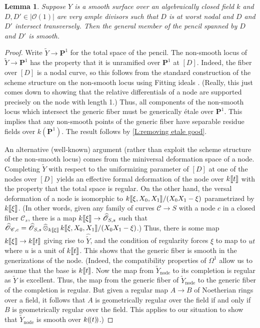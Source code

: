 \documentclass[11pt]{amsart}
\newcommand{\field}[1]{\mathbf #1}
\newcommand{\ms}[1]{\mathscr #1}
\renewcommand{\P}{\field P}
\renewcommand{\[}{[\!\hspace{0.03em}[}
\renewcommand{\]}{]\!\hspace{0.03em}]}
\renewcommand{\(}{(\!\hspace{0.03em}(}
\renewcommand{\)}{)\!\hspace{0.03em})}
\DeclareMathOperator*{\tensor}{\otimes}
\DeclareMathOperator*{\ctensor}{\widehat{\tensor}}
\newtheorem{lem}{Lemma}[subsubsection]%
\theoremstyle{definition}
\theoremstyle{remark}
\begin{document}
\begin{lem}\label{L:nodal pencil good} Suppose $Y$ is a smooth surface over an algebraically 
closed field $k$ and $D,D'\in|{\ms O}(1)|$ are 
very ample divisors such that $D$ is at worst nodal and $D$ and $D'$ intersect 
transversely.  Then the general member of the pencil spanned by $D$ 
and $D'$ is smooth.
\end{lem}
\begin{proof} Write $\widetilde Y\to\P^{1}$ for the total space of 
the pencil.   The non-smooth locus of $\widetilde Y\to\P^{1}$ has 
the property that it is unramified over $\P^{1}$ at $[D]$.  Indeed, 
the fiber over $[D]$ is a nodal curve, so this follows from the 
standard construction of the scheme structure on the non-smooth locus 
using Fitting ideals \cite[2.21]{dejong-alterations}.  (Really, this just comes down to showing 
that the relative differentials of a node are supported precisely on 
the node with length 1.)  
Thus, 
all components of the non-smooth locus which intersect the generic fiber must be generically \'etale over $\P^{1}$.  This 
implies that any non-smooth points of the generic fiber have separable 
residue fields over $k(\P^{1})$.  The result follows by 
\ref{L:removing etale good}.

An alternative (well-known) argument (rather than exploit the scheme structure of 
the non-smooth locus) comes from the miniversal deformation space of a 
node.  Completing $\widetilde Y$ with respect to the uniformizing 
parameter of $[D]$ at one of the nodes over $[D]$ 
yields an effective formal deformation of the node over $k\[t\]$ with 
the property that the total space is regular.  On the other hand, the 
versal deformation of a node is isomorphic to 
$k\[\xi,X_{0},X_{1}\]/(X_{0}X_{1}-\xi)$ parametrized by $k\[\xi\]$.  
(In other words, given any family of curves $\ms C\to S$ with a node 
$c$ in a closed fiber $\ms C_{s}$, there is a map 
$k\[\xi\]\to\widehat{{\ms O}}_{S,s}$ such that $\widehat{{\ms O}}_{\ms 
C,c}=\widehat{{\ms O}}_{S,s}\ctensor_{k\[\xi\]}k\[\xi,X_{0},X_{1}\]/(X_{0}X_{1}-\xi)$.)
Thus, there is some map $k\[\xi\]\to k\[t\]$ giving rise to 
$\widehat{\widetilde Y}$, and the condition of regularity forces 
$\xi$ to map to $ut$ where $u$ is a unit of $k\[t\]$.  This shows 
that the generic fiber is smooth in the generizations of the node.  
(Indeed, the compatibility properties of $\Omega^{1}$ allow us to 
assume that the base is $k\[t\]$.  Now the map from $\widetilde Y_{\text{node}}$ to its completion 
is regular as $\widetilde Y$ is excellent.  Thus, the map from the 
generic fiber of $\widetilde Y_{\text{node}}$ to the 
generic fiber of the completion is regular.  But given a regular map $A\to B$ 
of Noetherian rings over a field, it follows 
that $A$ is geometrically regular over the field if and only if $B$ is 
geometrically regular over the field.  This applies to our situation 
to show that $\widetilde Y_{\text{node}}$ is smooth over $k\(t\)$.)
\end{proof}
\end{document}
